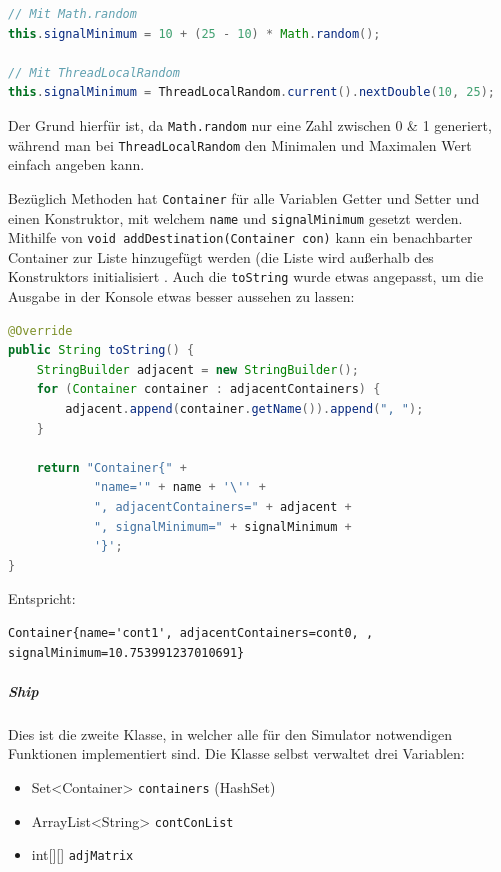 \documentclass[
    headings=optiontotocandhead,%
    twoside,
    numbers=noenddot,%
    12pt, %
    titlepage, %
    parskip=full, %
    listof=leveldown, 
    numbers=noenddot, %
    a4paper,DIV=14,
    BCOR=15mm,
]{scrbook}
\newcommand{\passthrough}[1]{#1}
\providecommand{\tightlist}{%
  \setlength{\itemsep}{0pt}\setlength{\parskip}{0pt}}
\begin{document}
\begin{lstlisting}[language=Java, caption={Zufällige Nummer mit .math und ThreadLocalRandom}]
// Mit Math.random
this.signalMinimum = 10 + (25 - 10) * Math.random();

// Mit ThreadLocalRandom
this.signalMinimum = ThreadLocalRandom.current().nextDouble(10, 25);
\end{lstlisting}

Der Grund hierfür ist, da \passthrough{\lstinline!Math.random!} nur eine
Zahl zwischen 0 \& 1 generiert, während man bei
\passthrough{\lstinline!ThreadLocalRandom!} den Minimalen und Maximalen
Wert einfach angeben kann.

Bezüglich Methoden hat \passthrough{\lstinline!Container!} für alle
Variablen Getter und Setter und einen Konstruktor, mit welchem
\passthrough{\lstinline!name!} und
\passthrough{\lstinline!signalMinimum!} gesetzt werden. Mithilfe von
\passthrough{\lstinline!void addDestination(Container con)!} kann ein
benachbarter Container zur Liste hinzugefügt werden (die Liste wird
außerhalb des Konstruktors initialisiert . Auch die
\passthrough{\lstinline!toString!} wurde etwas angepasst, um die Ausgabe
in der Konsole etwas besser aussehen zu lassen:

\begin{lstlisting}[language=Java, caption={Überarbeitung der .toString Methode von Container}]
@Override
public String toString() {
    StringBuilder adjacent = new StringBuilder();
    for (Container container : adjacentContainers) {
        adjacent.append(container.getName()).append(", ");
    }
  
    return "Container{" +
            "name='" + name + '\'' +
            ", adjacentContainers=" + adjacent +
            ", signalMinimum=" + signalMinimum +
            '}';
}
\end{lstlisting}

Entspricht:

\begin{lstlisting}[caption={Ausgabe mittels toString von Container}]
Container{name='cont1', adjacentContainers=cont0, , signalMinimum=10.753991237010691}
\end{lstlisting}

\hypertarget{ship}{%
\subparagraph{Ship}\label{ship}}

Dies ist die zweite Klasse, in welcher alle für den Simulator
notwendigen Funktionen implementiert sind. Die Klasse selbst verwaltet
drei Variablen:

\begin{itemize}
\tightlist
\item
  Set\textless Container\textgreater{}
  \passthrough{\lstinline!containers!} (HashSet)
\item
  ArrayList\textless String\textgreater{}
  \passthrough{\lstinline!contConList!}
\item
  int{[}{]}{[}{]} \passthrough{\lstinline!adjMatrix!}
\end{itemize}
\end{document}
